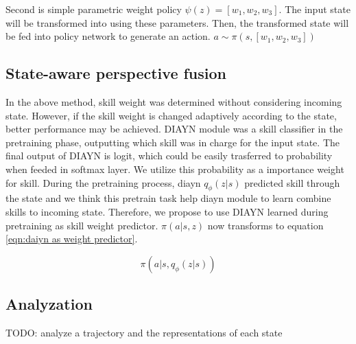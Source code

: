 Second is simple parametric weight policy  $\psi(z)=[w_1, w_2, w_3]$.
The input state will be transformed into using these parameters. 
Then, the transformed state will be fed into policy network to generate an action.
$a \sim \pi(s, [w_1,w_2,w_3])$





\subsection{State-aware perspective fusion}
In the above method, skill weight was determined without considering incoming state.
However, if the skill weight is changed adaptively according to the state, better performance may be achieved.
DIAYN module was a skill classifier in the pretraining phase, outputting which skill was in charge for the input state.
The final output of DIAYN is logit, which could be easily trasferred to probability when feeded in softmax layer.
We utilize this probability as a importance weight for skill. During the pretraining process, 
diayn $q_{\phi}(z|s)$ predicted skill through the state and we think this pretrain task help diayn module to learn combine skills  to incoming state.
Therefore, we propose to use DIAYN learned during pretraining as skill weight predictor.
$\pi(a|s,z)$ now transforms to equation \ref{eqn:daiyn as weight predictor}.

\begin{equation}
\label{eqn:daiyn as weight predictor}
    \pi(a|s,q_{\phi}(z|s))
\end{equation}


\subsection{Analyzation}
TODO: analyze a trajectory and the representations of each state


